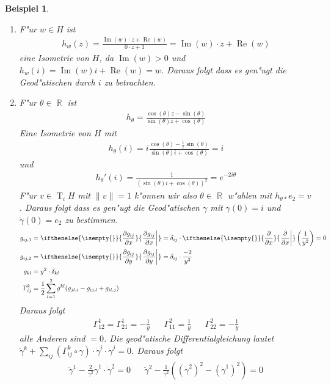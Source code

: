 \documentclass[paper=A4, twoside, chapterprefix=true, bibliography=totoc, headsepline]{scrbook}
\let\temp\phi{}
\let\phi\varphi{}
\let\varphi\temp{}
\let\temp\theta{}
\let\theta\vartheta{}
\let\vartheta\temp{}
\let\temp\epsilon{}
\let\epsilon\varepsilon{}
\let\varepsilon\temp{}
\let\temp\rho{}
\let\rho\varrho{}
\let\varrho\temp{}
\DeclareMathOperator{\R}{\mathbb{R}}
\DeclareMathOperator{\T}{T}         %
\renewcommand{\Re}{\ensuremath{\operatorname{Re}}}
\renewcommand{\Im}{\ensuremath{\operatorname{Im}}}
\newcommand{\pdifffrac}[3][]{\ifthenelse{\isempty{#1}}{\frac{\partial #2}{\partial #3}}{\left. \frac{\partial #2}{\partial #3} \right|_{#1}}}
\theoremstyle{plain}
\theoremstyle{nonumberplain}
\newtheorem{bsp}{Beispiel}
\theoremstyle{empty}
\theoremstyle{break}
\newcommand{\quot}[1]{\textrm{\glqq}{#1}\textrm{\grqq}}
\begin{document}
\begin{bsp}\begin{enumerate}[label=(\arabic*),leftmargin=*]
\item
	F"ur $w \in H$ ist
	\begin{align*}
		h_w(z) = \frac{\Im(w) \cdot z + \Re(w)}{0 \cdot z + 1} = \Im(w) \cdot z + \Re(w)
	\end{align*}
	eine Isometrie von $H$, da $\Im(w) > 0$ und $h_w(i) = \Im(w) i + \Re(w) = w$. Daraus folgt dass es gen"ugt die Geod"atischen durch $i$ zu betrachten.
\item
	F"ur $\vartheta \in \R$ ist
	\begin{align*}
		h_\vartheta = \frac{\cos(\vartheta)z - \sin(\vartheta)}{\sin(\vartheta)z + \cos(\vartheta)}
	\end{align*}
	Eine Isometrie von $H$ mit
	\begin{align*}
		h_\vartheta(i) = i \frac{\cos(\vartheta) - \frac{1}{i} \sin(\vartheta)}{\sin(\vartheta) i + \cos(\vartheta)} = i
	\end{align*}
	und
	\begin{align*}
		h_{\vartheta}'(i) = \frac{1}{(\sin(\vartheta) i + \cos(\vartheta))^2} = e^{-2i\vartheta}
	\end{align*}
	F"ur $v \in \T_iH$ mit $\|v\| = 1$ k"onnen wir also $\vartheta \in \R$ w"ahlen mit $h_{\vartheta *}e_2 = v$.
	Daraus folgt dass es gen"ugt die Geod"atischen $\gamma$ mit $\gamma(0) = i$ und $\dot\gamma(0) = e_2$ zu bestimmen.
	\begin{align*}
		g_{ij,1} &= \pdifffrac{g_{ij}}{x} = \delta_{ij} \cdot \pdifffrac{}{x} \left( \frac{1}{y^2} \right) = 0 \\
		g_{ij,2} &= \pdifffrac{g_{ij}}{y} = \delta_{ij} \cdot \frac{-2}{y^3} \\
		g_{kl} &= y^2 \cdot \delta_{kl} \\
		\Gamma_{ij}^k &= \frac{1}{2} \sum_{l=1}^2 g^{kl} (g_{jl,i} - g_{ij,l} + g_{il,j})
	\end{align*}
	Daraus folgt
	\begin{align*}
		\Gamma_{12}^1 = \Gamma_{21}^1 = - \frac{1}{y} && \Gamma_{11}^2 = \frac{1}{y} && \Gamma_{22}^2 = - \frac{1}{y}
	\end{align*}
	alle Anderen sind \quot{$=0$}.
	Die geod"atische Differentialgleichung lautet $\ddot\gamma^k + \sum_{ij} (\Gamma_{ij}^k \circ \gamma) \cdot \dot\gamma^{i} \cdot \dot\gamma^j = 0$. Daraus folgt
	\begin{align*}
		\ddot\gamma^1 - \frac{2}{\gamma^2} \dot\gamma^1 \cdot \dot\gamma^2 = 0 && \ddot\gamma^2 - \frac{1}{\gamma^2} ((\dot\gamma^2)^2 - (\dot\gamma^1)^2) = 0

\end{align*}
\end{enumerate}
\end{bsp}
\end{document}
